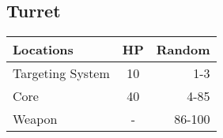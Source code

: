 \begin{multicols}{2}
\subsection{Turret}
\begin{minipage}{\columnwidth}
	\begin{tabularx}{\columnwidth}{|X|c|r|}
		\hline
		Locations        & HP & Random \\ \hline
		Targeting System & 10 &    1-3 \\ \hline
		Core             & 40 &   4-85 \\ \hline
		Weapon           & -  & 86-100 \\ \hline
	\end{tabularx}
\end{minipage}
\end{multicols}
